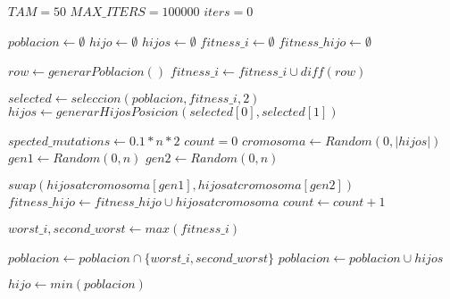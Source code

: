 \begin{algorithm}[H]
  \begin{algorithmic}[1]
      \State $TAM = 50$
      \State $MAX\_ITERS = 100000$
      \State $iters = 0$

      \State $poblacion \gets \emptyset$ 
      \State $hijo \gets \emptyset$ 
      \State $hijos \gets \emptyset$
      \State $fitness\_i \gets \emptyset$
      \State $fitness\_hijo \gets \emptyset$
      
        \State $row \gets generarPoblacion()$
        \State $fitness\_i \gets fitness\_i \cup diff(row)$
      \EndFor

        
        \State $selected \gets seleccion(poblacion,fitness\_i,2)$
        \State $hijos \gets generarHijosPosicion(selected[0],selected[1])$
        
        \State $spected\_mutations \gets 0.1*n*2$
        \State $count = 0$
          \State $cromosoma \gets Random(0,|hijos|)$ 
          \State $gen1 \gets Random(0,n)$
          \State $gen2 \gets Random(0,n)$ 

           
            \State $swap(hijos at cromosoma[gen1], hijos at cromosoma[gen2])$ 
            \State $fitness\_hijo \gets fitness\_hijo \cup hijos at cromosoma$ 
          \EndIf
          \State $count \gets count +1 $
        \EndWhile

        \State $worst\_i,second\_worst \gets max(fitness\_i)$ 
       
        \State $poblacion \gets poblacion \cap \{worst\_i,second\_worst\}$
        \State $poblacion \gets poblacion \cup {hijos}$ 
      
      \EndWhile
      
      \State $hijo \gets min(poblacion)$
      \State {}
    \EndFunction
  \end{algorithmic}
\end{algorithm}

